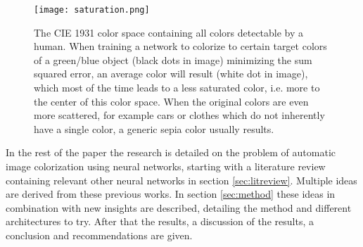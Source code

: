 \begin{wrapfigure}{r}{0.37\textwidth}
	\vspace{-20pt}
	\begin{center}
		\texttt{[image: saturation.png]}
	\end{center}
	\caption{\label{fig:colorspacesaturation} The CIE 1931 color space containing all colors detectable by a human. When training a network to colorize to certain target colors of a green/blue object (black dots in image) minimizing the sum squared error, an average color will result (white dot in image), which most of the time leads to a less saturated color, i.e. more to the center of this color space. When the original colors are even more scattered, for example cars or clothes which do not inherently have a single color, a generic sepia color usually results.}
	\vspace{-10pt}
\end{wrapfigure}
	
In the rest of the paper the research is detailed on the problem of automatic image colorization using neural networks, starting with a literature review containing relevant other neural networks in section \ref{sec:litreview}. Multiple ideas are derived from these previous works. In section \ref{sec:method} these ideas in combination with new insights are described, detailing the method and different architectures to try. After that the results, a discussion of the results, a conclusion and recommendations are given.
	
	




